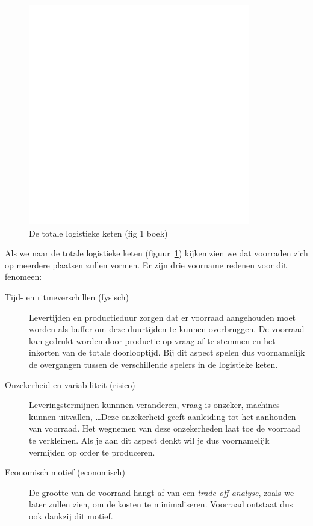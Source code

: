 \begin{figure}[htbp]
    \centering
    \includegraphics[scale=0.4]{Images/white.png}
    \caption{De totale logistieke keten (fig 1 boek)}
    \label{fig:totaleLogistiekeKeten}
\end{figure}
Als we naar de totale logistieke keten (figuur~\ref{fig:totaleLogistiekeKeten}) kijken zien we dat voorraden zich op meerdere plaatsen zullen vormen. Er zijn drie voorname redenen voor dit fenomeen:
\begin{description}
    \item[Tijd- en ritmeverschillen (fysisch)] Levertijden en productieduur zorgen dat er voorraad aangehouden moet worden als buffer om deze duurtijden te kunnen overbruggen. De voorraad kan gedrukt worden door productie op vraag af te stemmen en het inkorten van de totale doorlooptijd. Bij dit aspect spelen dus voornamelijk de overgangen tussen de verschillende spelers in de logistieke keten.
    \item[Onzekerheid en variabiliteit (risico)] Leveringstermijnen kunnnen veranderen, vraag is onzeker, machines kunnen uitvallen, \dots Deze onzekerheid geeft aanleiding tot het aanhouden van voorraad. Het wegnemen van deze onzekerheden laat toe de voorraad te verkleinen. Als je aan dit aspect denkt wil je dus voornamelijk vermijden op order te produceren.
    \item[Economisch motief (economisch)] De grootte van de voorraad hangt af van een \textit{trade-off analyse}, zoals we later zullen zien, om de kosten te minimaliseren. Voorraad ontstaat dus ook dankzij dit motief.
\end{description}

